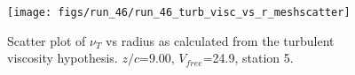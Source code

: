 \begin{figure}[H]
\centering
\texttt{[image: figs/run\_46/run\_46\_turb\_visc\_vs\_r\_meshscatter]}
\caption{Scatter plot of $\nu_T$ vs radius as calculated from the turbulent viscosity hypothesis. $z/c$=9.00, $V_{free}$=24.9, station 5.}
\label{fig:run_46_turb_visc_vs_r_meshscatter}
\end{figure}


